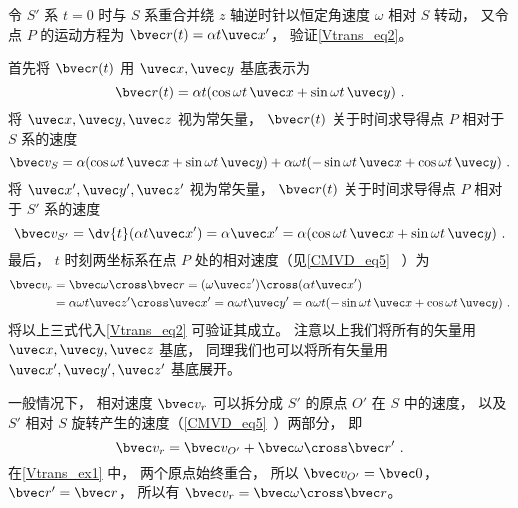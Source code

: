 \begin{example}{}\label{Vtrans_ex1}
令 $S'$ 系 $t = 0$ 时与 $S$ 系重合并绕 $z$ 轴逆时针以恒定角速度 $\omega$ 相对 $S$ 转动， 又令点 $P$ 的运动方程为 $\bvec r(t) = \alpha t \uvec x'$， 验证\autoref{Vtrans_eq2}。

首先将 $\bvec r(t)$ 用 $\uvec x, \uvec y$ 基底表示为
\begin{equation}
\bvec r(t) = \alpha t (\cos\omega t\, \uvec x + \sin\omega t\, \uvec y)~.
\end{equation}
将 $\uvec x, \uvec y, \uvec z$ 视为常矢量， $\bvec r(t)$ 关于时间求导得点 $P$ 相对于 $S$ 系的速度
\begin{equation}
\bvec v_S = \alpha (\cos\omega t \,\uvec x + \sin\omega t \,\uvec y)
+ \alpha\omega t (-\sin\omega t \,\uvec x + \cos\omega t \,\uvec y)~.
\end{equation}
将 $\uvec x', \uvec y', \uvec z'$ 视为常矢量， $\bvec r(t)$ 关于时间求导得点 $P$ 相对于 $S'$ 系的速度
\begin{equation}
\bvec v_{S'} = \dv{t} (\alpha t \uvec x') = \alpha \uvec x' = \alpha (\cos\omega t\, \uvec x + \sin\omega t \,\uvec y)~.
\end{equation}
最后， $t$ 时刻两坐标系在点 $P$ 处的相对速度（见\autoref{CMVD_eq5}~ ）为
\begin{equation}\label{Vtrans_eq3}
\begin{aligned}
\bvec v_r &= \bvec\omega \cross \bvec r = (\omega \uvec z') \cross (\alpha t \uvec x') \\
&= \alpha\omega t \uvec z'\cross\uvec x' = \alpha\omega t \uvec y' = \alpha\omega t(-\sin \omega t \,\uvec x + \cos\omega t \,\uvec y)~.
\end{aligned}\end{equation}
将以上三式代入\autoref{Vtrans_eq2} 可验证其成立。 注意以上我们将所有的矢量用 $\uvec x, \uvec y, \uvec z$ 基底， 同理我们也可以将所有矢量用 $\uvec x', \uvec y', \uvec z'$ 基底展开。
\end{example}

一般情况下， 相对速度 $\bvec v_r$ 可以拆分成 $S'$ 的原点 $O'$ 在 $S$ 中的速度， 以及 $S'$ 相对 $S$ 旋转产生的速度（\autoref{CMVD_eq5}~）两部分， 即
\begin{equation}\label{Vtrans_eq4}
\bvec v_r = \bvec v_{O'} + \bvec \omega \cross \bvec r'~.
\end{equation}
在\autoref{Vtrans_ex1} 中， 两个原点始终重合， 所以 $\bvec v_{O'} = \bvec 0$， $\bvec r' = \bvec r$， 所以有 $\bvec v_r = \bvec\omega \cross \bvec r$。

